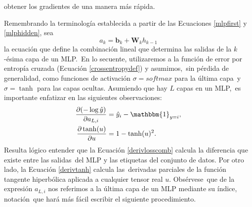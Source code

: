 obtener los gradientes de una manera más rápida.\par
Remembrando la terminología establecida a partir de las Ecuaciones \ref{mlpfirst} y \ref{mlphidden}, sea
\begin{equation}
  a_k = \bm{b}_k + \bm{W}_kh_{k-1} \label{mlplinearcomb}
\end{equation}
la ecuación que define la combinación lineal que determina las salidas de la $k$-ésima capa de un MLP.\
En lo secuente, utilizaremos a la función de error por entropía cruzada (Ecuación \ref{crossentropydef}) y asumimos,\
sin pérdida de generalidad, como funciones de activación $\sigma = softmax$ para la última capa\
y $\sigma = \tanh$ para las capas ocultas. Asumiendo que hay $L$ capas en un MLP,\
es importante enfatizar en las siguientes observaciones:
\begin{align}
  \frac{\partial(-\log \hat{y})}{\partial a_{L, i}} &= \hat{y}_i - \mathbbm{1}_{y=i}, \label{derivlosscomb}\\
  \frac{\partial \tanh(u)}{\partial u} &= 1 - \tanh(u)^2. \label{derivtanh}
\end{align}
Resulta lógico entender que la Ecuación \ref{derivlosscomb} calcula la diferencia que existe entre las salidas\
del MLP y las etiquetas del conjunto de datos. Por otro lado, la Ecuación \ref{derivtanh} calcula las\
derivadas parciales de la función tangente hiperbólica aplicada a cualquier tensor real $u$. Obsérvese\
que de la expresión $a_{L, i}$ nos referimos a la última capa de un MLP mediante su índice, notación\
que hará más fácil escribir el siguiente procedimiento.\par
